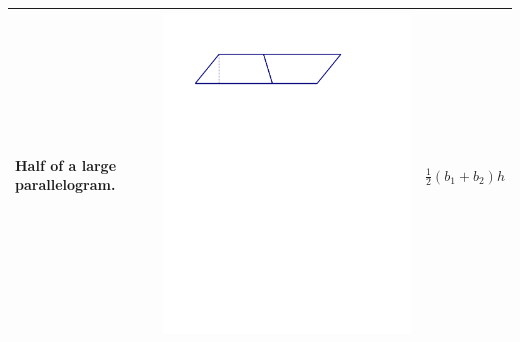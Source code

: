 \documentclass{ximera}
\begin{document}
{\begin{tabular}{|>{\centering\arraybackslash}m{2.5cm}|>{\centering\arraybackslash}m{9.5cm}|c|}
Half of a large parallelogram. & \includegraphics[scale=0.7]{./graphics/trapezoid3.pdf} & $\frac{1}{2}(b_1+b_2)h$ \\ \hline

\end{tabular}}
\end{document}
